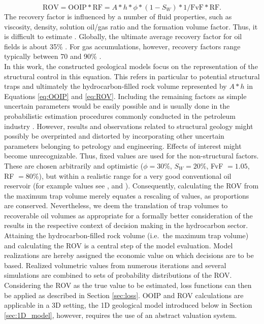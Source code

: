         \begin{equation}\label{eq:ROV}
                \text{ROV}= \text{OOIP} * \text{RF} = A * h * \phi * (1 - S_W) * 1/\text{FvF} * \text{RF}.
        \end{equation}
        The recovery factor is influenced by a number of fluid properties, such as viscosity, density, solution oil/gas ratio and the formation volume factor. Thus, it is difficult to estimate \citep{dean2007volumetric}. Globally, the ultimate average recovery factor for oil fields is about 35\% \citep{labastie2011increasingRF}. For gas accumulations, however, recovery factors range typically between 70 and 90\% \citep{dean2007volumetric}.\\
        In this work, the constructed geological models focus on the representation of the structural control in this equation. This refers in particular to potential structural traps and ultimately the hydrocarbon-filled rock volume represented by $A * h$ in Equations \ref{eq:OOIP} and \ref{eq:ROV}.
        Including the remaining factors as simple uncertain parameters would be easily possible and is usually done in the probabilistic estimation procedures commonly conducted in the petroleum industry \citep{wim2001guidelines, murtha1997monte, mudford2000valuing}. However, results and observations related to structural geology might possibly be overprinted and distorted by incorporating other uncertain parameters belonging to petrology and engineering. Effects of interest might become unrecognizable. Thus, fixed values are used for the non-structural factors. These are chosen arbitrarily and optimistic ($\phi=30\%$, $S_W=20\%$, FvF $=1.05$, RF $= 80\%$), but within a realistic range for a very good conventional oil reservoir (for example values see \citet{morton1993development}, \citet{ahmed2011advanced} and \citet{dandekar2013petroleum}). Consequently, calculating the ROV from the maximum trap volume merely equates a rescaling of values, as proportions are conserved. Nevertheless, we deem the translation of trap volumes to recoverable oil volumes as appropriate for a formally better consideration of the results in the respective context of decision making in the hydrocarbon sector.\\
        Attaining the hydrocarbon-filled rock volume (i.e.\ the maximum trap volume) and calculating the ROV is a central step of the model evaluation. Model realizations are hereby assigned the economic value on which decisions are to be based. Realized volumetric values from numerous iterations and several simulations are combined to sets of probability distributions of the ROV. Considering the ROV as the true value to be estimated, loss functions can then be applied as described in Section \ref{sec:loss}. OOIP and ROV calculations are applicable in a 3D setting, the 1D geological model introduced below in Section \ref{sec:1D_model}, however, requires the use of an abstract valuation system.
